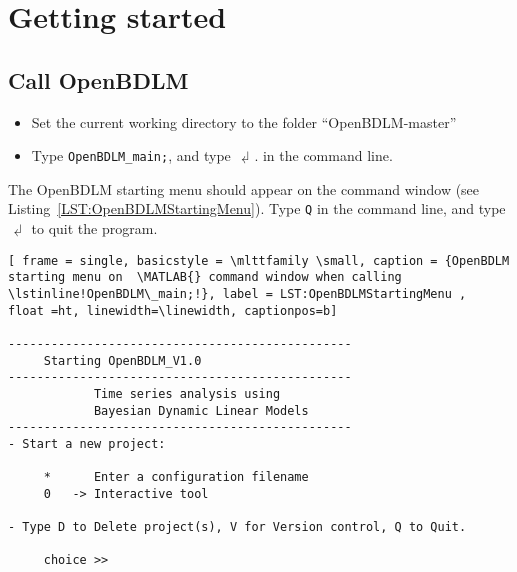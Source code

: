 \section{Getting started}
\label{S:OPENBDLMGETTINGSTARTED}
\subsection{Call OpenBDLM}
\begin{itemize}
\item Set the current working directory to the folder ``OpenBDLM-master''
\item Type \colorbox{light-gray}{\lstinline[basicstyle = \mlttfamily \small, backgroundcolor = \color{light-gray}]!OpenBDLM_main;!}, and type $\dlsh$.
in the \MATLAB{} command line.
\end{itemize}
The OpenBDLM starting menu should appear on the \MATLAB{} command window (see Listing~\ref{LST:OpenBDLMStartingMenu}).
Type \colorbox{light-gray}{\lstinline[basicstyle = \mlttfamily \small, backgroundcolor = \color{light-gray}]!Q!} in the command line, and type $\dlsh$ to quit the program.
\begin{lstlisting}[ frame = single, basicstyle = \mlttfamily \small, caption = {OpenBDLM starting menu on  \MATLAB{} command window when calling \lstinline!OpenBDLM\_main;!}, label = LST:OpenBDLMStartingMenu ,  float =ht, linewidth=\linewidth, captionpos=b]

------------------------------------------------
     Starting OpenBDLM_V1.0
------------------------------------------------
            Time series analysis using 
            Bayesian Dynamic Linear Models
------------------------------------------------
- Start a new project: 

     *      Enter a configuration filename 
     0   -> Interactive tool 

- Type D to Delete project(s), V for Version control, Q to Quit.

     choice >>
\end{lstlisting}


